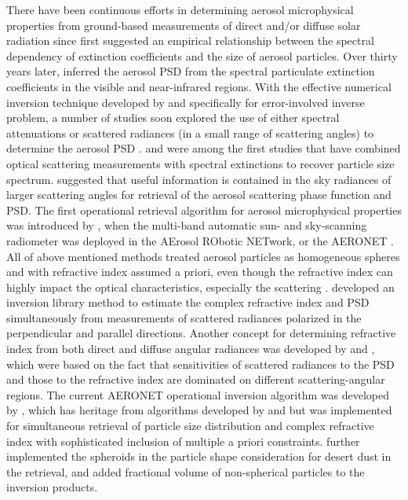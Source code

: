 There have been continuous efforts in determining aerosol microphysical
properties from ground-based measurements of direct and/or diffuse solar
radiation since \citet{Angstrom29} first suggested an empirical relationship
between the spectral dependency of extinction coefficients and the size of
aerosol particles. Over thirty years later, \citet{Curcio61} inferred the aerosol
PSD from the spectral particulate extinction coefficients in the visible and
near-infrared regions. With the effective numerical inversion technique
developed by \citet{Phillips62} and \citet{Twomey63} specifically for 
error-involved inverse problem, a number of studies soon
explored the use of either spectral attenuations or scattered radiances 
(in a small range of scattering angles) to determine the aerosol PSD
\citep{Twomey67,Yamamoto69,Dave71,Grassl71,Herman71,King78}.
\citet{Shaw79} and \citet{Nakajima83} were among the first studies 
that have combined optical scattering measurements with spectral 
extinctions to recover particle size spectrum. \citet{Kaufman94} 
suggested that useful information is contained
in the sky radiances of larger scattering angles for retrieval of the aerosol
scattering phase function and PSD. The first operational retrieval algorithm
for aerosol microphysical properties was introduced by \citet{Nakajima96},
when the multi-band automatic sun- and sky-scanning radiometer was deployed in
the AErosol RObotic NETwork, or the AERONET \citep{Holben98}. All of
above mentioned methods treated aerosol particles as homogeneous spheres and
with refractive index assumed a priori, even though the refractive index can
highly impact the optical characteristics, especially the scattering 
\citep{Hansen74}. \citet{Tanaka82,Tanaka83} developed an inversion library
method to estimate the complex refractive index and PSD simultaneously from
measurements of scattered radiances polarized in the perpendicular and parallel
directions. Another concept for determining refractive index from both direct
and diffuse angular radiances was developed by \citet{Wendisch94} and 
\citet{Yamasoe98}, which were based on the fact that
sensitivities of scattered radiances to the PSD and those to the refractive
index are dominated on different scattering-angular regions. The current
AERONET operational inversion algorithm was developed by \citet{Dubovik00a},
which has heritage from algorithms developed by \citet{King78} and
\citet{Nakajima83,Nakajima96} but was implemented for simultaneous retrieval of
particle size distribution and complex refractive index with sophisticated
inclusion of multiple a priori constraints. \citet{Dubovik02,Dubovik06} further
implemented the spheroids in the particle shape consideration for desert dust
in the retrieval, and added fractional volume of non-spherical particles to the
inversion products.

